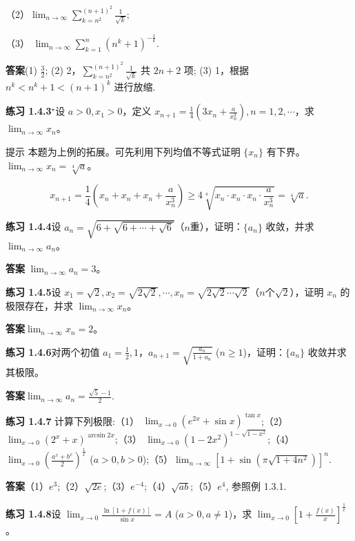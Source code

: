 \documentclass[lang=cn,10pt]{elegantbook}
\begin{document}
（2）$\lim_{n\rightarrow\infty} \sum_{k=n^2}^{(n+1)^2} \frac{1}{\sqrt{k}};$

（3） $\lim_{n\rightarrow\infty} \sum_{k=1}^{n} (n^k+1)^{-\frac{1}{k}}.$


\textbf{答案}(1) $\frac{3}{2}$; (2) 2，$\sum_{k=n^2}^{(n+1)^2} \frac{1}{\sqrt{k}}$ 共 $2n+2$ 项; (3) 1，根据 $n^k < n^k+1 < (n+1)^k$ 进行放缩.


\textbf{练习 1.4.3}${ }^{\star}$设 $a > 0, x_1 > 0$，定义 $x_{n+1} = \frac{1}{4} \left( 3x_n + \frac{a}{x_n^3} \right), n = 1, 2, \cdots$，求 $\lim_{n\rightarrow\infty} x_n$。

提示 本题为上例的拓展。可先利用下列均值不等式证明 $\{x_n\}$ 有下界。 $\lim_{n\rightarrow\infty} x_n = \sqrt[4]{a}$。

\[
x_{n+1} = \frac{1}{4} \left( x_n + x_n + x_n + \frac{a}{x_n^3} \right) \geq 4 \sqrt[4]{x_n \cdot x_n \cdot x_n \cdot \frac{a}{x_n^3}} = \sqrt[4]{a}.
\]


\textbf{练习 1.4.4}设 $a_n = \sqrt{6 + \sqrt{6 + \cdots + \sqrt{6}}}$（$n$重），证明：$\{a_n\}$ 收敛，并求 $\lim_{n\rightarrow\infty} a_n$。

\textbf{答案} $\lim_{n\rightarrow\infty} a_n = 3$。


\textbf{练习 1.4.5}设 $x_1 = \sqrt{2}, x_2 = \sqrt{2\sqrt{2}}, \cdots, x_n = \sqrt{2\sqrt{2}\cdots\sqrt{2}}$（$n$个$\sqrt{2}$），证明 $x_n$ 的极限存在，并求 $\lim_{n\rightarrow\infty} x_n$。

\textbf{答案}$\lim_{n\rightarrow\infty} x_n = 2$。


\textbf{练习 1.4.6}对两个初值 $a_1 = \frac{1}{2}, 1$，$a_{n+1} = \sqrt{\frac{a_n}{1 + a_n}}$ ($n \geq 1$)，证明：$\{a_n\}$ 收敛并求其极限。

\textbf{答案}$\lim_{n\rightarrow\infty} a_n = \frac{\sqrt{5} - 1}{2}$.


\textbf{练习 1.4.7} 计算下列极限:（1） $\lim_{x\rightarrow 0}\left(e^{2x}+\sin x\right)^{\tan x}$;（2）$\lim_{x\rightarrow 0}\left(2^x+x\right)^{\arcsin 2x}$;（3） $\lim_{x\rightarrow 0}\left(1-2x^2\right)^{1-\sqrt{1-x^2}}$;（4）$\lim_{x\rightarrow 0}\left(\frac{a^x+b^x}{2}\right)^{\frac{1}{x}}$ ($a>0, b>0$);（5）$\lim_{n\rightarrow\infty}\left[1+\sin\left(\pi\sqrt{1+4n^2}\right)\right]^n$.

\textbf{答案}（1）$e^3$;（2）$\sqrt{2e}$;（3）$e^{-4}$;（4）$\sqrt{ab}$;（5）$e^4$, 参照例 1.3.1.


\textbf{练习 1.4.8}设 $\lim_{x\rightarrow 0} \frac{\ln\left[1+f(x)\right]}{\sin x} = A$ ($a > 0, a \neq 1$)，求 $\lim_{x\rightarrow 0} \left[1+\frac{f(x)}{x}\right]^{\frac{1}{x}}$。
\end{document}
